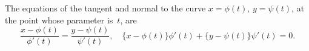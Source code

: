 The equations of the tangent and normal to the curve $x = \phi(t)$,
$y = \psi(t)$, at the point whose parameter is~$t$, are
\[
\frac{x - \phi(t)}{\phi'(t)} = \frac{y - \psi(t)}{\psi'(t)},\quad
\{x - \phi(t)\} \phi'(t) + \{y - \psi(t)\} \psi'(t) = 0.
\]

